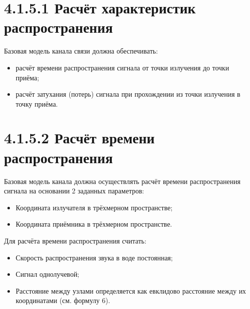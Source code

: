 \section{4.1.5.1 Расчёт характеристик
распространения}\label{ux440ux430ux441ux447ux451ux442-ux445ux430ux440ux430ux43aux442ux435ux440ux438ux441ux442ux438ux43a-ux440ux430ux441ux43fux440ux43eux441ux442ux440ux430ux43dux435ux43dux438ux44f}

Базовая модель канала связи должна обеспечивать:

\begin{itemize}
\item
  расчёт времени распространения сигнала от точки излучения до точки
  приёма;
\item
  расчёт затухания (потерь) сигнала при прохождении из точки излучения в
  точку приёма.
\end{itemize}

\section{4.1.5.2 Расчёт времени
распространения}\label{ux440ux430ux441ux447ux451ux442-ux432ux440ux435ux43cux435ux43dux438-ux440ux430ux441ux43fux440ux43eux441ux442ux440ux430ux43dux435ux43dux438ux44f}

Базовая модель канала должна осуществлять расчёт времени распространения
сигнала на основании 2 заданных параметров:

\begin{itemize}
\item
  Координата излучателя в трёхмерном пространстве;
\item
  Координата приёмника в трёхмерном пространстве.
\end{itemize}

Для расчёта времени распространения считать:

\begin{itemize}
\item
  Скорость распространения звука в воде постоянная;
\item
  Сигнал однолучевой;
\item
  Расстояние между узлами определяется как евклидово расстояние между их
  координатами (см. формулу 6).
\end{itemize}

